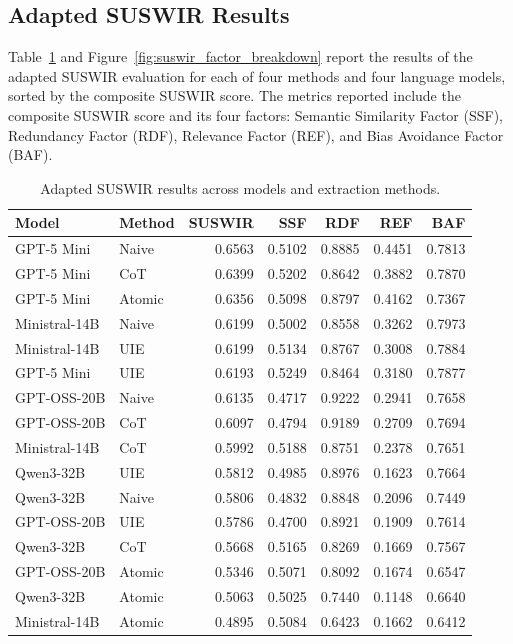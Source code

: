 \subsection{Adapted SUSWIR Results}

Table~\ref{tab:adapted_suswir} and Figure~\ref{fig:suswir_factor_breakdown} report the results of the adapted SUSWIR evaluation for each of four methods and four language models, sorted by the composite SUSWIR score.
The metrics reported include the composite SUSWIR score and its four factors: Semantic Similarity Factor (SSF), Redundancy Factor (RDF), Relevance Factor (REF), and Bias Avoidance Factor (BAF).

\begin{table}[htbp]
	\centering
	\caption{Adapted SUSWIR results across models and extraction methods.}
	\label{tab:adapted_suswir}
	\begin{tabular}{llrrrrr}
		\toprule
		\textbf{Model} & \textbf{Method} & \textbf{SUSWIR} & \textbf{SSF} & \textbf{RDF} & \textbf{REF} & \textbf{BAF} \\
		\midrule
		GPT-5 Mini    & Naive  & 0.6563 & 0.5102 & 0.8885 & 0.4451 & 0.7813 \\
		GPT-5 Mini    & CoT    & 0.6399 & 0.5202 & 0.8642 & 0.3882 & 0.7870 \\
		GPT-5 Mini    & Atomic & 0.6356 & 0.5098 & 0.8797 & 0.4162 & 0.7367 \\
		Ministral-14B & Naive  & 0.6199 & 0.5002 & 0.8558 & 0.3262 & 0.7973 \\
		Ministral-14B & UIE    & 0.6199 & 0.5134 & 0.8767 & 0.3008 & 0.7884 \\
		GPT-5 Mini    & UIE    & 0.6193 & 0.5249 & 0.8464 & 0.3180 & 0.7877 \\
		GPT-OSS-20B   & Naive  & 0.6135 & 0.4717 & 0.9222 & 0.2941 & 0.7658 \\
		GPT-OSS-20B   & CoT    & 0.6097 & 0.4794 & 0.9189 & 0.2709 & 0.7694 \\
		Ministral-14B & CoT    & 0.5992 & 0.5188 & 0.8751 & 0.2378 & 0.7651 \\
		Qwen3-32B     & UIE    & 0.5812 & 0.4985 & 0.8976 & 0.1623 & 0.7664 \\
		Qwen3-32B     & Naive  & 0.5806 & 0.4832 & 0.8848 & 0.2096 & 0.7449 \\
		GPT-OSS-20B   & UIE    & 0.5786 & 0.4700 & 0.8921 & 0.1909 & 0.7614 \\
		Qwen3-32B     & CoT    & 0.5668 & 0.5165 & 0.8269 & 0.1669 & 0.7567 \\
		GPT-OSS-20B   & Atomic & 0.5346 & 0.5071 & 0.8092 & 0.1674 & 0.6547 \\
		Qwen3-32B     & Atomic & 0.5063 & 0.5025 & 0.7440 & 0.1148 & 0.6640 \\
		Ministral-14B & Atomic & 0.4895 & 0.5084 & 0.6423 & 0.1662 & 0.6412 \\
		\bottomrule
	\end{tabular}
\end{table}

